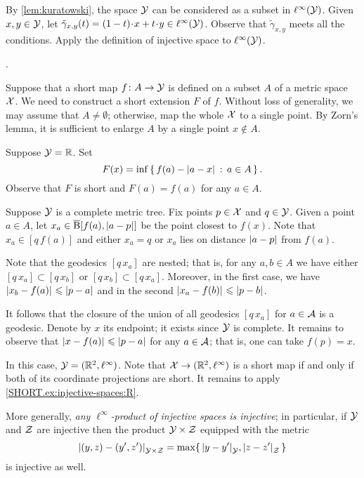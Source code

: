 By \ref{lem:kuratowski}, the space $\mathcal{Y}$ can be considered as a subset in $\ell^\infty(\mathcal{Y})$.
Given $x,y\in \mathcal{Y}$, let $\tilde\gamma_{x,y}(t)=(1-t)\cdot x+t\cdot y\in \ell^\infty(\spc{Y})$.
Observe that $\tilde\gamma_{x,y}$ meets all the conditions.
Apply the definition of injective space to $\ell^\infty(\mathcal{Y})$.

 \cite[3.6]{lang-2013}.

Suppose that a short map $f\colon A\to\mathcal{Y}$ is defined on a subset $A$ of a metric space $\mathcal{X}$.
We need to construct a short extension $F$ of $f$.
Without loss of generality, we may assume that $A\ne\emptyset$;
otherwise, map the whole $\mathcal{X}$ to a single point.
By Zorn's lemma, it is sufficient to enlarge $A$ by a single point $x\notin A$.

Suppose $\mathcal{Y}=\mathbb{R}$.
Set 
\[F(x)=\inf\set{f(a)-\dist{a}{x}{}}{a\in A}.\] 
Observe that $F$ is short and $F(a)=f(a)$ for any $a\in A$.

Suppose  $\mathcal{Y}$ is a complete metric tree.
Fix points $p\in \mathcal{X}$ and $q\in\mathcal{Y}$.
Given a point $a\in A$,
let $x_a\in\cBall[f(a),\dist{a}{p}{}]$ be the point closest to $f(x)$.
Note that $x_a\in[q\,f(a)]$ and either $x_a=q$ or $x_a$ lies on distance $\dist{a}{p}{}$ from $f(a)$.

Note that the geodesics $[q\,x_a]$ are nested;
that is, for any $a,b\in A$ we have either $[q\,x_a]\subset [q\,x_b]$ or $[q\,x_b]\subset [q\,x_a]$.
Moreover, in the first case, we have $\dist{x_b}{f(a)}{}\le \dist{p}{a}{}$ and in the second $\dist{x_a}{f(b)}{}\le \dist{p}{b}{}$.

It follows that the closure of the union of all geodesics $[q\,x_a]$ for $a\in\mathcal{A}$ is a geodesic.
Denote by $x$ its endpoint; it exists since $\mathcal{Y}$ is complete.
It remains to observe that $\dist{x}{f(a)}{}\le \dist{p}{a}{}$ for any $a\in\mathcal{A}$;
that is, one can take $f(p)=x$.

In this case, $\mathcal{Y}=(\mathbb{R}^2,\ell^\infty)$.
Note that $\mathcal{X}\to (\mathbb{R}^2,\ell^\infty)$ is a short map if and only if both of its coordinate projections are short.
It remains to apply \ref{SHORT.ex:injective-spaces:R}.

More generally, \textit{any $\ell^\infty$-product of injective spaces is injective};
in particular, if $\mathcal{Y}$ and $\mathcal{Z}$ are injective then the product $\mathcal{Y}\times\mathcal{Z}$ equipped with the metric 
\[\dist{(y,z)}{(y',z')}{\spc{Y}\times\spc{Z}}=\max\{\,\dist{y}{y'}{\spc{Y}},\dist{z}{z'}{\spc{Z}}\,\}\]
is injective as well.

